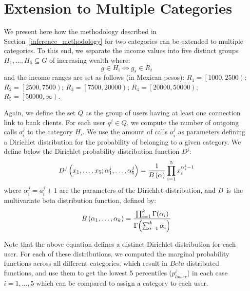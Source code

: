 \section{Extension to Multiple Categories}

We present here how the methodology described in Section~\ref{inference_methodology} for
two categories can be extended to multiple categories.
To this end, we separate the income values into five distinct groups $ H_1, \ldots, H_5 \subseteq G$ of increasing wealth where:
\[
	g \in H_i \iff g_s \in R_i
\]
and the income ranges are set as follows (in Mexican pesos):
	$R_1 = \left[1000, 2500\right) $;
	$R_2 = \left[2500, 7500\right) $;
	$R_3 = \left[7500, 20000\right) $;
	$R_4 = \left[20000, 50000\right) $;
	$R_5 = \left[50000, \infty\right) $.

Again, we define the set $Q$ as the group of users having at least one connection link to bank clients. For each user $q^j \in Q$, we compute the number of outgoing calls $a^j_i$ to the category $H_i$. 
We use the amount of calls $a^j_i$  as parameters defining a Dirichlet distribution for the probability of belonging to a given category. 
We define below the Dirichlet probability distribution function $D^j$:  
\begin{equation}
D^j \left( x_1, \ldots, x_5; \alpha^j_1, \ldots, \alpha^j_5 \right) = \frac{1}{B \left( \alpha \right)} \prod^5_{i = 1} x_i^{\alpha^j_i - 1}
\label{Dirichlet}
\end{equation}
where $\alpha^j_i = a^j_i +1$ are the parameters of the Dirichlet distribution, and $B$ is the multivariate beta distribution function, defined by: %
\begin{equation}
B \left( \alpha_1, \ldots, \alpha_k \right) = \frac{\prod^k_{i = 1} \Gamma \! \left( \alpha_i \right)}{\Gamma \! \left( \sum^k_{i = 1} \alpha_i \right) }
\label{Beta} 
\end{equation}

Note that the above equation defines a distinct Dirichlet distribution for each user. For each of these distributions, we computed the marginal probability functions across all different categories, which result in $Beta$ distributed functions, and use them to get the  lowest 5 percentiles ($p^i_{lower}$) in each case ${i=1, \ldots, 5}$ which can be compared to assign a category to each user. 

